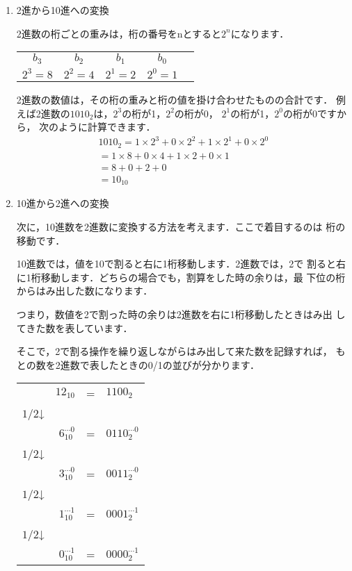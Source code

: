 \begin{enumerate}
\item 2進から10進への変換

2進数の桁ごとの重みは，桁の番号をnとすると$2^n$になります．
\begin{center}
\begin{tabular}{c c c c c }
$b_3$ & $b_2$ & $b_1$ & $b_0$ \\
$2^3 = 8$ & $2^2 = 4$ & $2^1 = 2$ & $2^0 = 1$ \\
\end{tabular}
\end{center}
2進数の数値は，その桁の重みと桁の値を掛け合わせたものの合計です．
例えば2進数の$1010_2$は，$2^3$の桁が1，$2^2$の桁が0，
$2^1$の桁が1，$2^0$の桁が0ですから，
次のように計算できます．
{\small
\begin{eqnarray}
1010_2 = 1 \times 2^3 + 0 \times 2^2 + 1 \times 2^1 + 0 \times 2^0 \nonumber \\
 = 1 \times 8 + 0 \times 4 + 1 \times 2 + 0 \times 1 \nonumber \\
 = 8 + 0 + 2 + 0 \nonumber \\
 = 10_{10} \nonumber
\end{eqnarray}
}

\item 10進から2進への変換

次に，10進数を2進数に変換する方法を考えます．ここで着目するのは
桁の移動です．

10進数では，値を10で割ると右に1桁移動します．2進数では，2で
割ると右に1桁移動します．どちらの場合でも，割算をした時の余りは，最
下位の桁からはみ出した数になります．

つまり，数値を2で割った時の余りは2進数を右に1桁移動したときはみ出
してきた数を表しています．

そこで，2で割る操作を繰り返しながらはみ出して来た数を記録すれば，
もとの数を2進数で表したときの0/1の並びが分かります．

\begin{center}
\begin{tabular}{l r l l }
      & $12_{10}$ & = & $1100_2$ \\
$1/2$↓ &                   &                         \\
      & $6_{10}^{\cdots 0}$  & = & $0110_2^{\cdots 0}$ \\
$1/2$↓ &                    &                         \\
      & $3_{10}^{\cdots 0}$  & = & $0011_2^{\cdots 0}$ \\
$1/2$↓ &                    &                         \\
      & $1_{10}^{\cdots 1}$  & = & $0001_2^{\cdots 1}$ \\
$1/2$↓ &                    &                         \\
      & $0_{10}^{\cdots 1}$  & = & $0000_2^{\cdots 1}$ \\
\end{tabular}
\end{center}
\end{enumerate}
